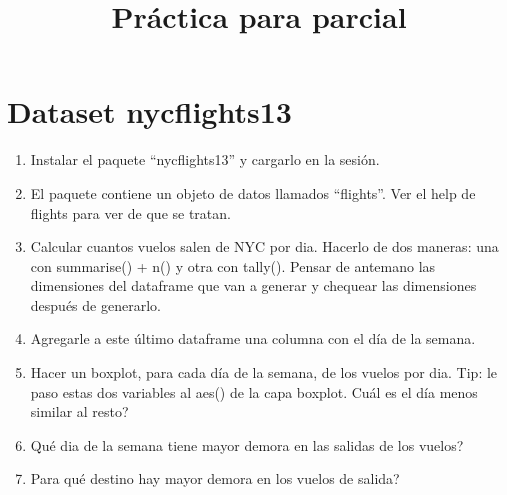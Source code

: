 \documentclass[]{article}
\title{Práctica para parcial}
\date{}
\providecommand{\tightlist}{%
  \setlength{\itemsep}{0pt}\setlength{\parskip}{0pt}}
\begin{document}
\maketitle

\hypertarget{dataset-nycflights13}{%
\section{Dataset nycflights13}\label{dataset-nycflights13}}

\begin{enumerate}
\def\labelenumi{\arabic{enumi}.}
\tightlist
\item
  Instalar el paquete ``nycflights13'' y cargarlo en la sesión.
\item
  El paquete contiene un objeto de datos llamados ``flights''. Ver el
  help de flights para ver de que se tratan.
\item
  Calcular cuantos vuelos salen de NYC por dia. Hacerlo de dos maneras:
  una con summarise() + n() y otra con tally(). Pensar de antemano las
  dimensiones del dataframe que van a generar y chequear las dimensiones
  después de generarlo.
\item
  Agregarle a este último dataframe una columna con el día de la semana.
\item
  Hacer un boxplot, para cada día de la semana, de los vuelos por dia.
  Tip: le paso estas dos variables al aes() de la capa boxplot. Cuál es
  el día menos similar al resto?
\item
  Qué dia de la semana tiene mayor demora en las salidas de los vuelos?
\item
  Para qué destino hay mayor demora en los vuelos de salida?
\end{enumerate}
\end{document}
